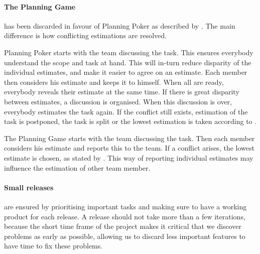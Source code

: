 \paragraph{The Planning Game} has been discarded in favour of Planning Poker as described by \citet{xp:planningPoker}.
The main difference is how conflicting estimations are resolved. 

Planning Poker starts with the team discussing the task. This ensures everybody understand the scope and task at hand. This will in-turn reduce disparity of the individual estimates, and make it easier to agree on an estimate. Each member then considers his estimate and keeps it to himself. When all are ready, everybody reveals their estimate at the same time. If there is great disparity between estimates, a discussion is organised. When this discussion is over, everybody estimates the task again. If the conflict still exists, estimation of the task is postponed, the task is split or the lowest estimation is taken according to \citet[p. 1]{xp:planningPoker}.

The Planning Game starts with the team discussing the task. Then each member considers his estimate and reports this to the team. If a conflict arises, the lowest estimate is chosen, as stated by \citet[p. 58]{xp:planning}.
This way of reporting individual estimates may influence the estimation of other team member. 

\paragraph{Small releases} are ensured by prioritising important tasks and making sure to have a working product for each release. A release should not take more than a few iterations, because the short time frame of the project makes it critical that we discover problems as early as possible, allowing us to discard less important features to have time to fix these problems.

